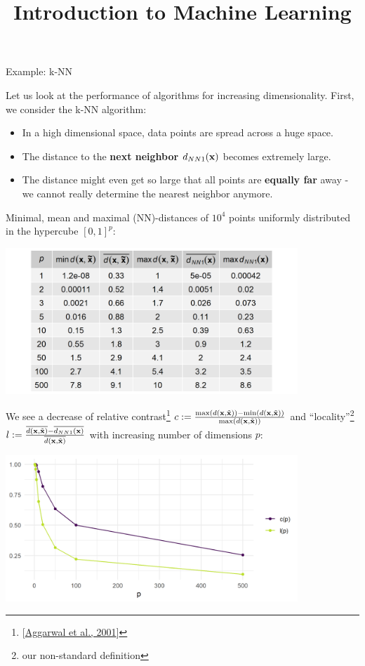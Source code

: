 \documentclass[11pt,compress,t,notes=noshow, xcolor=table]{beamer}
\title{Introduction to Machine Learning}
\date{}
\begin{document}


\begin{vbframe}{Example: k-NN}

Let us look at the performance of algorithms for increasing dimensionality. First, we consider the k-NN algorithm:

\begin{itemize}
\item In a high dimensional space, data points are spread across a huge space.
\item The distance to the \textbf{next neighbor} $d_{NN1}(\mathbf{x})$ becomes extremely large.
\item The distance might even get so large that all points are \textbf{equally far} away - we cannot really determine the nearest neighbor anymore.
\end{itemize}

\framebreak 

Minimal, mean and maximal (NN)-distances of $10^{4}$ points uniformly distributed in the hypercube $[0,1]^p$:

\begin{center}
\includegraphics[width = 11cm ]{figure/knn_table.png}
\end{center}

\framebreak

We see a decrease of relative contrast\footnote{[\href{https://bib.dbvis.de/uploadedFiles/155.pdf}{Aggarwal et al., 2001}]} $c := \frac{\max(d(\mathbf{x},\tilde{\mathbf{x}})) - \min(d(\mathbf{x},\tilde{\mathbf{x}}))}{\max(d(\mathbf{x},\tilde{\mathbf{x}}))}$ and \enquote{locality}\footnote{our non-standard definition} $l := \frac{\overline{d(\mathbf{x},\tilde{\mathbf{x}})} -  \overline{d_{NN1}(\mathbf{x})}}{\overline{d(\mathbf{x},\tilde{\mathbf{x}})}}$ with increasing number of dimensions $p$:


\begin{center}
\includegraphics[width = 11cm ]{figure/knn_contrast_locality_plot.png}
\end{center}

\end{vbframe}
\end{document}
